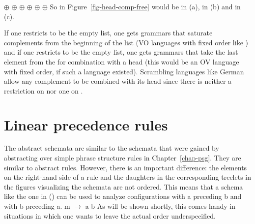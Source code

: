 \eal
\ex \eliste{} $\oplus$  $\oplus$  
\ex {} $\oplus$  $\oplus$  
\ex {} $\oplus$  $\oplus$ \eliste 
\zl
So  in Figure~\ref{fig-head-comp-free} would be \npnom in (a), \npdat in (b) and \npacc in (c).

If one restricts  to be the
empty list, one gets grammars that saturate complements from the beginning of the list (VO languages
with fixed order like ) and if one restricts  to be the empty list, one gets grammars that take the last
element from the \compsl for combination with a head (this would be an OV language with fixed
order, if such a language existed). Scrambling languages like German allow any
complement to be combined with its head since there is neither a restriction on  nor one on .



\section{Linear precedence rules}
\label{sec-lp-rules}

The abstract schemata are similar to the schemata that were gained by abstracting over simple phrase
structure rules in Chapter~\ref{chap-psg}. They are similar to abstract \xbar rules. However, there
is an important difference: the elements on the right-hand side of a rule and the daughters in the
corresponding treelets in the figures visualizing the schemata are not ordered. This means that a
schema like the one in () can be used to analyze configurations with a preceding b and with
b preceding a.
\ea
m $\to$ a b
\z
As will be shown shortly, this comes handy in situations in which one wants to leave the actual
order underspecified.

